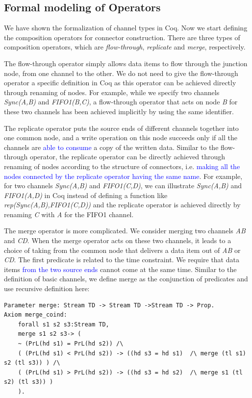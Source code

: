 \documentclass[preprint,3p]{elsarticle}
\newcommand{\liyi}[1]{\textcolor{blue}{#1}}
\newcommand{\xy}[1]{{#1}}
\begin{document}
\subsection{Formal modeling of Operators}
\xy{We have shown the formalization of channel types in Coq}. Now we start defining the composition operators for connector construction. \xy{There are three types of composition operators}, which are \emph{flow-through}, \emph{replicate} and \emph{merge}, respectively.

The flow-through operator simply allows data items to flow through the junction node, from one channel to the other. \xy{We do not need to give the flow-through operator a specific definition in Coq as this operator can be achieved directly through renaming of nodes.} For example, \xy{while we specify} two channels \emph{Sync(A,B)} and \emph{FIFO1(B,C)}, a flow-through operator that acts on node \emph{B} for these two channels has been \xy{achieved implicitly by using the same identifier.}

The replicate operator puts the source ends of different channels together into one common node, and a write operation on this node succeeds only if all the channels are \liyi{able to consume} a copy of the written data. %
\xy{Similar to the flow-through operator, the replicate operator can be directly achieved through renaming of nodes according to the structure of connectors, i.e. \liyi{making all the nodes connected by the replicate operator having the same name}.} For example, for two channels \emph{Sync(A,B)} and \emph{FIFO1(C,D)}, we can illustrate \emph{Sync(A,B)} and \emph{FIFO1(A,D)} in Coq instead of defining a function like \emph{rep(Sync(A,B),FIFO1(C,D))} and the replicate operator is achieved directly by renaming \emph{C} with \emph{A} for the FIFO1 channel.

The merge operator is more complicated. We consider merging two
channels \emph{AB} and \emph{CD}. When the merge operator acts on
these two channels, it leads to a choice of taking from the common
node that delivers a data item out of \emph{AB} or \emph{CD}.
\xy{The first predicate is related to the time constraint. We require that data items \liyi{from the two source ends} cannot come at the same time.
Similar to the definition of basic channels, we define merge as the conjunction of predicates and use recursive definition here:}
\begin{lstlisting}[language=coq]
Parameter merge: Stream TD -> Stream TD ->Stream TD -> Prop.
Axiom merge_coind:
    forall s1 s2 s3:Stream TD,
    merge s1 s2 s3-> (
    ~ (PrL(hd s1) = PrL(hd s2)) /\
    ( (PrL(hd s1) < PrL(hd s2)) -> ((hd s3 = hd s1)  /\ merge (tl s1) s2 (tl s3)) ) /\
    ( (PrL(hd s1) > PrL(hd s2)) -> ((hd s3 = hd s2)  /\ merge s1 (tl s2) (tl s3)) )
    ).
\end{lstlisting}
\end{document}
